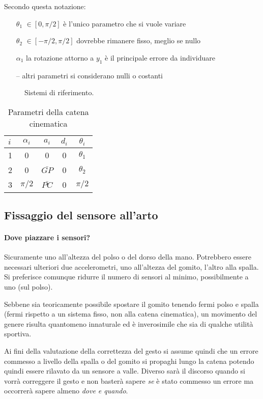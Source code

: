 Secondo questa notazione:
\begin{itemize}
	\item [$\theta_{1}$] {$\in [0, \pi/2]$ \`e l'unico parametro che si vuole variare}
	\item [$\theta_{2}$] {$\in [-\pi/2, \pi/2]$ dovrebbe rimanere fisso, meglio se nullo}
	\item [$\alpha_{1}$] la rotazione attorno a $y_{1}$ \`e il principale errore da individuare
	\item [--] {altri parametri si considerano nulli o costanti}
\end{itemize}

\begin{figure}
  \centering
    
  \caption{Sistemi di riferimento.}
  \label{fig:gomito1}
\end{figure}

\begin{table}
\centering
\caption{Parametri della catena cinematica}
\label{tab:robo}
\begin{tabular} {l c c c c}
	\hline
	$i$ & $\alpha_{i}$ & $a_{i}$ & $d_{i}$ & $\theta_{i}$\\
	\hline
	1 & 0 & 0 & 0 & $\theta_{1}$ \\
	2 & 0 & $\bar{GP}$ & 0 & $\theta_{2}$ \\
	3 & $\pi/2$ & $\bar{PC}$ & 0 & $\pi/2$ \\
	\hline
\end{tabular}
\end{table}





\subsection{Fissaggio del sensore all'arto}
\label{ssez:fissaggio}

\paragraph{Dove piazzare i sensori?}
Sicuramente uno all'altezza del polso o del dorso della mano.
Potrebbero essere necessari ulteriori due accelerometri,
uno all'altezza del gomito, l'altro alla spalla.
Si preferisce comunque ridurre il numero di sensori al minimo,
possibilmente a uno (sul polso).

Sebbene sia teoricamente possibile spostare il gomito
tenendo fermi polso e spalla
(fermi rispetto a un sistema fisso, non alla catena cinematica),
un movimento del genere risulta quantomeno innaturale
ed è inverosimile che sia di qualche utilità sportiva.

Ai fini della valutazione della correttezza del gesto
si assume quindi che un errore commesso a livello della spalla
o del gomito si propaghi lungo la catena
potendo quindi essere rilavato da un sensore a valle.
Diverso sarà il discorso quando si vorrà correggere il gesto
e non basterà sapere \emph{se} è stato commesso un errore
ma occorrerà sapere almeno \emph{dove e quando}.
